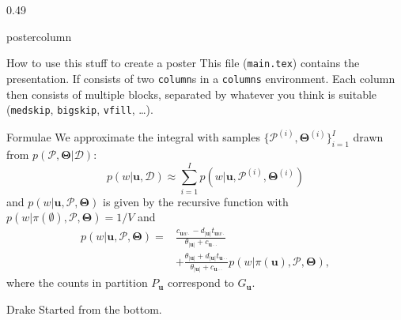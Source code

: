 \documentclass{article}
\begin{document}
\begin{frame}
\begin{columns}
\begin{column}{0.49\textwidth}
\begin{beamercolorbox}[center, wd=\textwidth]{postercolumn}
\begin{minipage}[T]{0.95\textwidth}
{\begin{block}{How to use this stuff to create a poster}
        This file (\texttt{main.tex}) contains the presentation. If consists of two \texttt{column}s in a \texttt{columns} environment. Each column then consists of multiple blocks, separated by whatever you think is suitable (\texttt{medskip}, \texttt{bigskip}, \texttt{vfill}, \ldots). 
    \end{block}
    \medskip
    \begin{block}{Formulae}
    	We approximate the integral with samples $\{\mathcal{P}^{(i)}, \boldsymbol\Theta^{(i)}\}_{i=1}^I$ drawn from $p(\mathcal{P}, \boldsymbol\Theta|\mathcal{D})$: 
  	\begin{equation}
    	p(w|\mathbf{u},\mathcal{D})\approx\sum_{i=1}^{I}p(w|\mathbf{u},\mathcal{P}^{(i)},\boldsymbol\Theta^{(i)})
        \end{equation}
  and $p(w|\mathbf{u}, \mathcal{P},\boldsymbol\Theta)$ is given by the recursive function with  $p(w|\pi(\emptyset),\mathcal{P},\boldsymbol\Theta) = 1/V$ and 
  \begin{equation}
  	\begin{split}
    	p(w|\mathbf{u},\mathcal{P},\boldsymbol\Theta) = &\frac{c_{\mathbf{u}w\cdot}-d_{|\mathbf{u}|}t_{\mathbf{u}w\cdot}}{\theta_{|\mathbf{u}|}+c_{\mathbf{u}\cdot\cdot}} \\
        &+ \frac{\theta_{|\mathbf{u}|}+d_{|\mathbf{u}|}t_{\mathbf{u}\cdot\cdot}}{\theta_{|\mathbf{u}|}+c_{\mathbf{u}\cdot\cdot}} p(w|\pi(\mathbf{u}),\mathcal{P},\boldsymbol\Theta),
        \end{split}
        \end{equation}
        where the counts in partition $P_{\mathbf{u}}$ correspond to $G_{\mathbf{u}}$.
    \end{block}
    \vfill
    \begin{block}{Drake}
    	Started from the bottom.
    \end{block}
}
\end{minipage}
\end{beamercolorbox}
\end{column}


\end{columns}
\end{frame}
\end{document}

